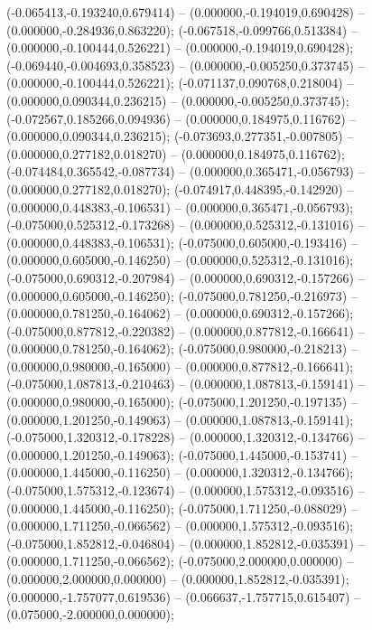  (-0.065413,-0.193240,0.679414) -- (0.000000,-0.194019,0.690428) -- (0.000000,-0.284936,0.863220);
 (-0.067518,-0.099766,0.513384) -- (0.000000,-0.100444,0.526221) -- (0.000000,-0.194019,0.690428);
 (-0.069440,-0.004693,0.358523) -- (0.000000,-0.005250,0.373745) -- (0.000000,-0.100444,0.526221);
 (-0.071137,0.090768,0.218004) -- (0.000000,0.090344,0.236215) -- (0.000000,-0.005250,0.373745);
 (-0.072567,0.185266,0.094936) -- (0.000000,0.184975,0.116762) -- (0.000000,0.090344,0.236215);
 (-0.073693,0.277351,-0.007805) -- (0.000000,0.277182,0.018270) -- (0.000000,0.184975,0.116762);
 (-0.074484,0.365542,-0.087734) -- (0.000000,0.365471,-0.056793) -- (0.000000,0.277182,0.018270);
 (-0.074917,0.448395,-0.142920) -- (0.000000,0.448383,-0.106531) -- (0.000000,0.365471,-0.056793);
 (-0.075000,0.525312,-0.173268) -- (0.000000,0.525312,-0.131016) -- (0.000000,0.448383,-0.106531);
 (-0.075000,0.605000,-0.193416) -- (0.000000,0.605000,-0.146250) -- (0.000000,0.525312,-0.131016);
 (-0.075000,0.690312,-0.207984) -- (0.000000,0.690312,-0.157266) -- (0.000000,0.605000,-0.146250);
 (-0.075000,0.781250,-0.216973) -- (0.000000,0.781250,-0.164062) -- (0.000000,0.690312,-0.157266);
 (-0.075000,0.877812,-0.220382) -- (0.000000,0.877812,-0.166641) -- (0.000000,0.781250,-0.164062);
 (-0.075000,0.980000,-0.218213) -- (0.000000,0.980000,-0.165000) -- (0.000000,0.877812,-0.166641);
 (-0.075000,1.087813,-0.210463) -- (0.000000,1.087813,-0.159141) -- (0.000000,0.980000,-0.165000);
 (-0.075000,1.201250,-0.197135) -- (0.000000,1.201250,-0.149063) -- (0.000000,1.087813,-0.159141);
 (-0.075000,1.320312,-0.178228) -- (0.000000,1.320312,-0.134766) -- (0.000000,1.201250,-0.149063);
 (-0.075000,1.445000,-0.153741) -- (0.000000,1.445000,-0.116250) -- (0.000000,1.320312,-0.134766);
 (-0.075000,1.575312,-0.123674) -- (0.000000,1.575312,-0.093516) -- (0.000000,1.445000,-0.116250);
 (-0.075000,1.711250,-0.088029) -- (0.000000,1.711250,-0.066562) -- (0.000000,1.575312,-0.093516);
 (-0.075000,1.852812,-0.046804) -- (0.000000,1.852812,-0.035391) -- (0.000000,1.711250,-0.066562);
 (-0.075000,2.000000,0.000000) -- (0.000000,2.000000,0.000000) -- (0.000000,1.852812,-0.035391);
 (0.000000,-1.757077,0.619536) -- (0.066637,-1.757715,0.615407) -- (0.075000,-2.000000,0.000000);
